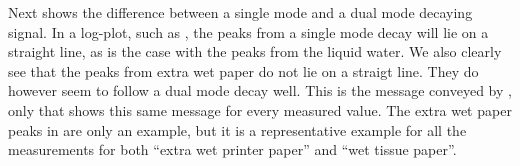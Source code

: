 \documentclass[11pt,a4paper, twocolumn,
swedish, english %
]{article}
\begin{document}
Next  shows the difference between a single
mode and a dual mode decaying signal. In a log-plot, such as
, the peaks from a single mode decay will lie
on a straight line, as is the case with the peaks from the liquid
water. We also clearly see that the peaks from extra wet paper
do not lie on a straigt line. They do however seem to follow a dual
mode decay well. This is the message conveyed by
, only that  shows this same
message for every measured value. The extra wet paper peaks in
 are only an example, but it is a
representative example for all the measurements for both ``extra wet
printer paper'' and ``wet tissue paper''.



\end{document}
